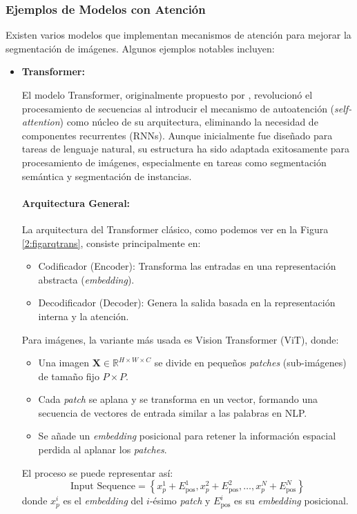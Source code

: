 \subsubsection{Ejemplos de Modelos con Atención}  
Existen varios modelos que implementan mecanismos de atención para mejorar la segmentación de imágenes. Algunos ejemplos notables incluyen:
\begin{itemize}
    \item \textbf{Transformer:} 
    
	El modelo Transformer, originalmente propuesto por  \cite{autor2022transformer}, revolucionó el procesamiento de secuencias al introducir el mecanismo de autoatención (\textit{self-attention}) como núcleo de su arquitectura, eliminando la necesidad de componentes recurrentes (RNNs). Aunque inicialmente fue diseñado para tareas de lenguaje natural, su estructura ha sido adaptada exitosamente para procesamiento de imágenes, especialmente en tareas como segmentación semántica y segmentación de instancias.

\paragraph{Arquitectura General:}

La arquitectura del Transformer clásico, como podemos ver en la Figura \ref{2:figarqtrans}, consiste principalmente en:
\begin{itemize}[label=$\bullet$, leftmargin=1em]
    \item Codificador (Encoder): Transforma las entradas en una representación abstracta (\textit{embedding}).
    \item Decodificador (Decoder): Genera la salida basada en la representación interna y la atención.
\end{itemize}
Para imágenes, la variante más usada es Vision Transformer (ViT), donde:
\begin{itemize}[label=$\bullet$, leftmargin=1em]
    \item Una imagen $\mathbf{X} \in \mathbb{R}^{H \times W \times C}$ se divide en pequeños \textit{patches} (sub-imágenes) de tamaño fijo $P \times P$.
    \item Cada \textit{patch} se aplana y se transforma en un vector, formando una secuencia de vectores de entrada similar a las palabras en NLP.
    \item Se añade un \textit{embedding} posicional para retener la información espacial perdida al aplanar los \textit{patches}.
\end{itemize}
El proceso se puede representar así:
\begin{equation}\label{eq:input_sequence_transformer}
    \text{Input Sequence} = \left\{ x_p^1 + E_{\text{pos}}^1, x_p^2 + E_{\text{pos}}^2, \ldots, x_p^N + E_{\text{pos}}^N \right\}
\end{equation}
donde $x_p^i$ es el \textit{embedding} del $i$-ésimo \textit{patch} y $E_{\text{pos}}^i$ es su \textit{embedding} posicional.



\end{itemize}
